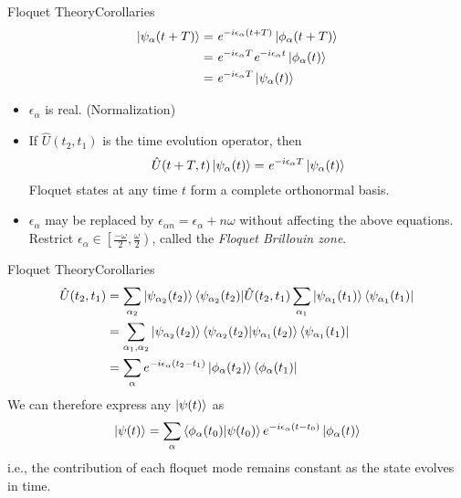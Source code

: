 \documentclass{beamer}
\begin{document}
\begin{frame}{Floquet Theory}{Corollaries}
\small
\begin{align*}
  \ket{\psi_{\alpha}(t+T)} &= \mathit{e}^{-i \epsilon_{\alpha} (t+T)} \ket{\phi_{\alpha}(t+T)} \\
  &= \mathit{e}^{-i \epsilon_{\alpha} T} \mathit{e}^{-i \epsilon_{\alpha} t} \ket{\phi_{\alpha}(t)} \\  
  &= \mathit{e}^{-i \epsilon_{\alpha} T} \ket{\psi_{\alpha}(t)}
\end{align*}
\begin{itemize}
 \item $\epsilon_{\alpha}$ is real. (Normalization)
 \item If $\hat{U}(t_2, t_1)$ is the time evolution operator, then 
 \begin{equation*}
  \hat{U}(t + T, t)\ket{\psi_{\alpha}(t)} = \mathit{e}^{-i \epsilon_{\alpha} T} \ket{\psi_{\alpha}(t)}
 \end{equation*}
 Floquet states at any time $t$ form a complete orthonormal basis.
 \item $\epsilon_\alpha$ may be replaced by $\epsilon_{\alpha n}=\epsilon_\alpha + n\omega$ without affecting the above equations.
 Restrict $\epsilon_\alpha \in \left[\frac{-\omega}{2}, \frac{\omega}{2}\right)$, called the \emph{Floquet Brillouin zone}.
\end{itemize}\normalsize
\end{frame}
\begin{frame}{Floquet Theory}{Corollaries}
\small
\begin{align*}
  \hat{U}(t_2, t_1) &= \sum_{\alpha_2}{\ket{\psi_{\alpha_2}(t_2)}\bra{\psi_{\alpha_2}(t_2)}}\hat{U}(t_2, t_1)\sum_{\alpha_1}{\ket{\psi_{\alpha_1}(t_1)}\bra{\psi_{\alpha_1}(t_1)}} \nonumber \\
  &= \sum_{\alpha_1, \alpha_2}{\ket{\psi_{\alpha_2}(t_2)}\braket{\psi_{\alpha_2}(t_2)|\psi_{\alpha_1}(t_2)}\bra{\psi_{\alpha_1}(t_1)}} \nonumber \\
  &= \sum_{\alpha}{e^{-i\epsilon_\alpha (t_2 - t_1)} \ket{\phi_\alpha (t_2)}\bra{\phi_\alpha (t_1)}}
\end{align*}
\normalsize
We can therefore express any $\ket{\psi(t)}$ as
\begin{equation*}
  \ket{\psi(t)} = \sum_{\alpha}{\braket{\phi_\alpha (t_0) | \psi(t_0)} e^{-i\epsilon_\alpha (t - t_0)} \ket{\phi_\alpha (t)}} 
\end{equation*} i.e., the contribution of each floquet mode remains constant as the state evolves in time.
\end{frame}
\end{document}
